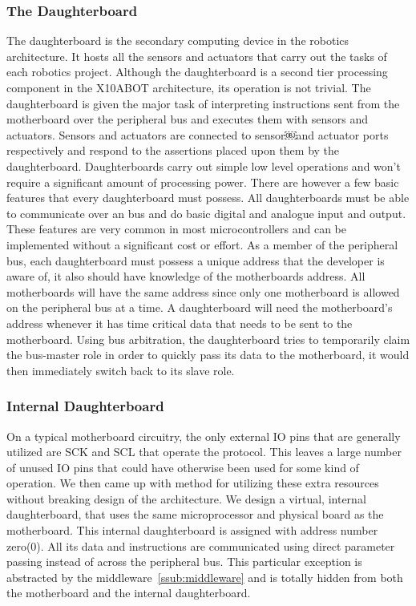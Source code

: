 	\subsubsection{The Daughterboard} %
	\label{ssub:the_daughterboard}
	The daughterboard is the secondary computing device in the \xten robotics architecture. It hosts all the sensors and actuators that carry out the tasks of each robotics project. Although the daughterboard is a second tier processing component in the X10ABOT architecture, its operation is not trivial. The daughterboard is given the major task of interpreting instructions sent from the motherboard over the peripheral bus and executes them with sensors and actuators. Sensors and actuators are connected to sensor￼and actuator ports respectively and respond to the assertions placed upon them by the daughterboard. Daughterboards carry out simple low level operations and won't require a significant amount of processing power. There are however a few basic features that every daughterboard must possess. All daughterboards must be able to communicate over an \iic bus and do basic digital and analogue input and output. These features are very common in most microcontrollers and can be implemented without a significant cost or effort.
	As a member of the peripheral bus, each daughterboard must possess a unique address that the developer is aware of, it also should have knowledge of the motherboards address. All motherboards will have the same address since only one motherboard is allowed on the peripheral bus at a time. A daughterboard will need the motherboard's address whenever it has time critical data that needs to be sent to the motherboard. Using bus arbitration, the daughterboard tries to temporarily claim the bus-master role in order to quickly pass its data to the motherboard, it would then immediately switch back to its slave role.
	\subsubsection{Internal Daughterboard} %
	\label{ssub:internal_daughterboard}
	
	On a typical motherboard circuitry, the only external IO pins that are generally utilized are SCK and SCL that operate the \iic protocol. This leaves a large number of unused IO pins that could have otherwise been used for some kind of operation. We then came up with method for utilizing these extra resources without breaking design of the architecture. We design a virtual, internal daughterboard, that uses the same microprocessor and physical board as the motherboard. This internal daughterboard is assigned with address number zero(0). All its data and instructions are communicated using direct parameter passing instead of across the peripheral bus. This particular exception is abstracted by the middleware~\ref{ssub:middleware} and is totally hidden from both the motherboard and the internal daughterboard.
	
